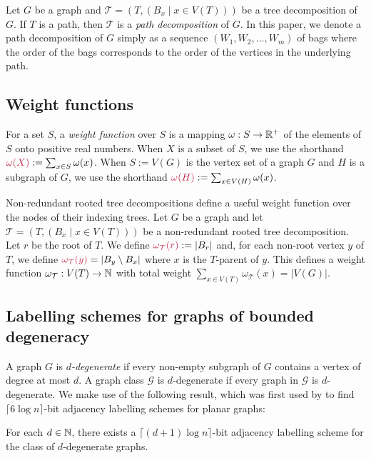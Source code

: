 \documentclass{patmorin}
\makeatletter
\newcommand{\defin}[1]{\emph{\textcolor{brightmaroon}{#1}}}
\def\mathcolor#1#{\@mathcolor{#1}}
\def\@mathcolor#1#2#3{%
  \protect\leavevmode
  \begingroup
    \color#1{#2}#3%
  \endgroup
}
\newcommand{\mathdefin}[1]{\mathcolor{brightmaroon}{#1}}
\newcommand{\calT}{\mathcal{T}}
\makeatother
\begin{document}
Let $G$ be a graph and $\calT=(T,(B_x \mid x\in V(T)))$ be a tree decomposition of $G$.
If $T$ is a path, then $\calT$ is
a \defin{path decomposition} of $G$.
In this paper, we denote a path decomposition of $G$ simply as a sequence $(W_1, W_2, \dots, W_m)$
of bags where the order of the bags corresponds to the order of the vertices in the underlying path.

  \subsection{Weight functions}

  For a set $S$, a \defin{weight function} over $S$ is a mapping $\omega:S\to\mathbb{R}^+$ of the elements of $S$ onto positive real numbers.  When $X$ is a subset of $S$, we use the shorthand $\mathdefin{\omega(X)}:=\sum_{x\in S}\omega(x)$.  When $S:=V(G)$ is the vertex set of a graph $G$ and $H$ is a subgraph of $G$, we use the shorthand $\mathdefin{\omega(H)}:=\sum_{x\in V(H)}\omega(x)$.

  Non-redundant rooted tree decompositions define a useful weight function over the nodes of their indexing trees.
  Let $G$ be a graph and let $\mathcal{T}=(T,(B_x \mid x\in V(T)))$ be a non-redundant rooted tree decomposition.
  Let $r$ be the root of $T$.
  We define $\mathdefin{\omega_\mathcal{T}(r)}:=|B_r|$ and, for each non-root vertex $y$ of $T$, we define   $\mathdefin{\omega_{\mathcal{T}}(y)} = |B_y\setminus B_x|$ where $x$ is the $T$-parent of $y$.  This defines a weight function $\omega_\mathcal{T}:V(T)\to \mathbb{N}$ with total weight $\sum_{x\in V(T)}\omega_\mathcal{T}(x)=|V(G)|$.



  \subsection{Labelling schemes for graphs of bounded degeneracy}

  A graph $G$ is \defin{$d$-degenerate} if every non-empty subgraph of $G$ contains a vertex of degree at most $d$. A graph class $\mathcal{G}$ is $d$-degenerate if every graph in $\mathcal{G}$ is $d$-degenerate. We make use of the following result, which was first used by \citet{muller:local} to find $\lceil6\log n\rceil$-bit adjacency labelling schemes for planar graphs:

  \begin{thm}
  \label{degenerate_labelling_scheme}
    For each $d\in\mathbb{N}$, there exists a $\lceil(d+1)\log n\rceil$-bit adjacency labelling scheme for the class of $d$-degenerate graphs.
  \end{thm}
\end{document}
